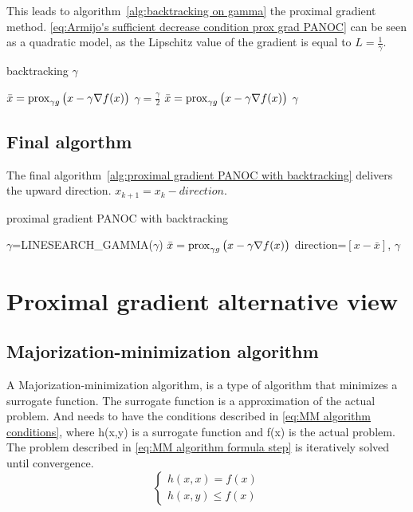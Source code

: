 			This leads to algorithm~\ref{alg:backtracking on gamma} the proximal gradient method. \eqref{eq:Armijo's sufficient decrease condition prox grad PANOC} can be seen as a quadratic model, as the Lipschitz value of the gradient is equal to $L=\frac{1}{\gamma}$.
			
			\begin{algorithm}
				\caption{backtracking $\gamma$}
				\label{alg:backtracking on gamma}
				\begin{algorithmic}[1]
					\State $\bar{x} = \operatorname{prox}_{\gamma g}\big( x- \gamma \nabla f(x)\big)$
					\State $\gamma = \frac{\gamma}{2}$
					\State $\bar{x} = \operatorname{prox}_{\gamma g}\big( x- \gamma \nabla f(x)\big)$
					\EndWhile
					\State \Return $\gamma$
					\EndProcedure
				\end{algorithmic}
			\end{algorithm}
	\subsection{Final algorthm}
		The final algorithm~\ref{alg:proximal gradient PANOC with backtracking} delivers the upward direction. $x_{k+1}=x_k - direction$.
		\begin{algorithm}
			\caption{proximal gradient PANOC with backtracking}
			\label{alg:proximal gradient PANOC with backtracking}
			\begin{algorithmic}[1]
				\Procedure{get\_proximal\_gradient\_step}{x,$\gamma$}
				\State $\gamma$=LINESEARCH\_GAMMA($\gamma$)
				\State $\bar{x} = \operatorname{prox}_{\gamma g}\big( x- \gamma \nabla f(x)\big)$
				\State \Return direction=$[x-\bar{x}]$, $\gamma$
				\EndProcedure
			\end{algorithmic}
		\end{algorithm}
\section{Proximal gradient alternative view}
	\subsection{Majorization-minimization algorithm}
	A Majorization-minimization algorithm, is a type of algorithm that minimizes a surrogate function. The surrogate function is a approximation of the actual problem. And needs to have the conditions described in \eqref{eq:MM algorithm conditions}, where h(x,y) is a surrogate function and f(x) is the actual problem. The problem described in \eqref{eq:MM algorithm formula step} is iteratively solved until convergence.
	\begin{equation}
		\begin{cases}
			h(x,x) = f(x) \\
			h(x,y) \leq f(x)
		\end{cases}
		\label{eq:MM algorithm conditions}
	\end{equation}
	
